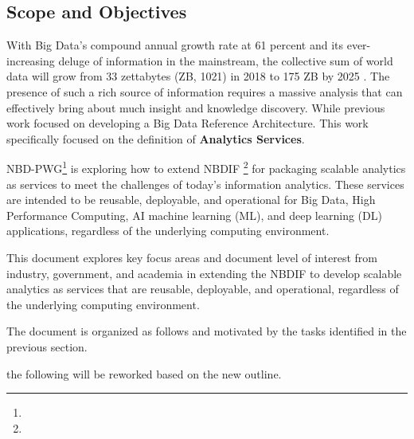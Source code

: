 \subsection{Scope and Objectives}

With Big Data’s compound annual growth rate at 61 percent and its
ever-increasing deluge of information in the mainstream, the
collective sum of world data will grow from 33 zettabytes (ZB, 1021)
in 2018 to 175 ZB by 2025 . The presence of such a rich source of
information requires a massive analysis that can effectively bring
about much insight and knowledge discovery. While previous work
focused on developing a Big Data Reference Architecture. This work
specifically focused on the definition of {\bf Analytics Services}.

NBD-PWG\footnote{} is exploring how
to extend NBDIF \footnote{} for packaging scalable analytics as services to meet
the challenges of today’s information analytics. These services are
intended to be reusable, deployable, and operational for Big Data,
High Performance Computing, AI machine learning (ML), and deep
learning (DL) applications, regardless of the underlying computing
environment.

This document explores key focus areas and document level of interest
from industry, government, and academia in extending the NBDIF to
develop scalable analytics as services that are reusable, deployable,
and operational, regardless of the underlying computing environment.

The document is organized as follows and motivated by the tasks
identified in the previous section.

 the following will be reworked based on the new outline.

